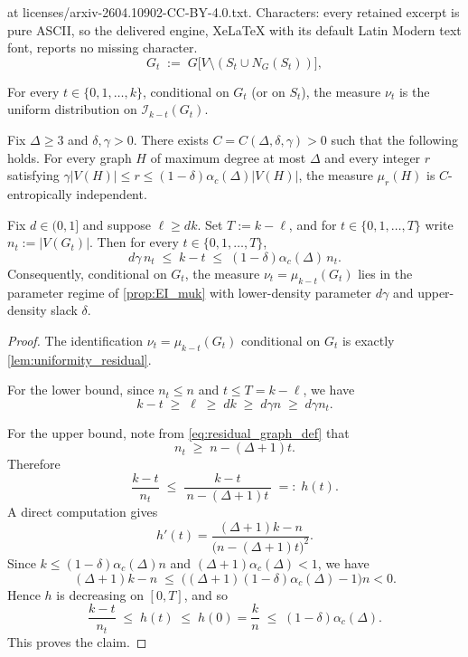 \documentclass[10pt,a4paper]{amsart}
\newcommand{\cI}{\mathcal{I}}
\begin{document}
at licenses/arxiv-2604.10902-CC-BY-4.0.txt. Characters: every retained excerpt is pure ASCII, so the delivered engine, XeLaTeX with its default Latin Modern text font, reports no missing character.
\begin{equation}
\label{eq:residual_graph_def}
G_t \;:=\; G\big[V\setminus (S_t\cup N_G(S_t))\big],
\end{equation}

\begin{lemma}
\label{lem:uniformity_residual}
For every $t\in\{0,1,\dots,k\}$, conditional on $G_t$ (or on $S_t$), the measure $\nu_t$
is the uniform distribution on $\cI_{k-t}(G_t)$.
\end{lemma}

\begin{proposition}
\label{prop:EI_muk}
Fix $\Delta\ge 3$ and $\delta,\gamma>0$. There exists $C=C(\Delta,\delta,\gamma)>0$ such that the following holds.
For every graph $H$ of maximum degree at most $\Delta$ and every integer $r$ satisfying
$\gamma|V(H)|\le r \le (1-\delta)\alpha_c(\Delta)|V(H)|$, the measure $\mu_r(H)$ is $C$-entropically independent.
\end{proposition}

\begin{lemma}
\label{lem:residual_density_window}
Fix $d\in(0,1]$ and suppose $\ell\ge dk$. Set $T:=k-\ell$, and for $t\in\{0,1,\dots,T\}$ write
$n_t:=|V(G_t)|$.
Then for every $t\in\{0,1,\dots,T\}$,
\[
d\gamma\, n_t \;\le\; k-t \;\le\; (1-\delta)\alpha_c(\Delta)\, n_t.
\]
Consequently, conditional on $G_t$, the measure $\nu_t=\mu_{k-t}(G_t)$ lies in the parameter regime of
\cref{prop:EI_muk} with lower-density parameter $d\gamma$ and upper-density slack $\delta$.
\end{lemma}

\begin{proof}
The identification $\nu_t=\mu_{k-t}(G_t)$ conditional on $G_t$ is exactly
\cref{lem:uniformity_residual}.

For the lower bound, since $n_t\le n$ and $t\le T=k-\ell$, we have
\[
k-t \;\ge\; \ell \;\ge\; dk \;\ge\; d\gamma n \;\ge\; d\gamma n_t.
\]

For the upper bound, note from \eqref{eq:residual_graph_def} that
\[
n_t \;\ge\; n-(\Delta+1)t.
\]
Therefore
\[
\frac{k-t}{n_t}
\;\le\;
\frac{k-t}{\,n-(\Delta+1)t\,}
\;=:\;
h(t).
\]
A direct computation gives
\[
h'(t)
=
\frac{(\Delta+1)k-n}{\bigl(n-(\Delta+1)t\bigr)^2}.
\]
Since $k\le (1-\delta)\alpha_c(\Delta)n$ and $(\Delta+1)\alpha_c(\Delta)<1$, we have
\[
(\Delta+1)k-n
\;\le\;
\bigl((\Delta+1)(1-\delta)\alpha_c(\Delta)-1\bigr)n
<0.
\]
Hence $h$ is decreasing on $[0,T]$, and so
\[
\frac{k-t}{n_t}
\;\le\;
h(t)
\;\le\;
h(0)
=
\frac{k}{n}
\;\le\;
(1-\delta)\alpha_c(\Delta).
\]
This proves the claim.
\end{proof}
\end{document}
